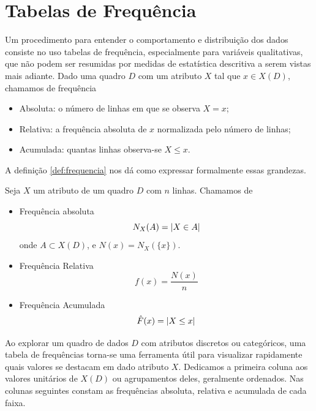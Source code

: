 \section{Tabelas de Frequência}

Um procedimento para entender o comportamento e distribuição dos dados consiste no uso
tabelas de frequência, especialmente para variáveis qualitativas, que não podem ser
resumidas por medidas de estatística descritiva a serem vistas mais adiante.
Dado uma quadro $D$ com um atributo $X$ tal que $x \in X(D)$, chamamos de frequência
\begin{itemize}
\item Absoluta: o número de linhas em que se observa $X = x$;
\item Relativa: a frequência absoluta de $x$ normalizada pelo número de linhas;
\item Acumulada: quantas linhas observa-se $X \le x$.
\end{itemize}
A definição \ref{def:frequencia} nos dá como expressar formalmente essas grandezas.

\begin{def:frequencia}
\label{def:frequencia}
Seja $X$ um atributo de um quadro $D$ com $n$ linhas.
Chamamos de
\begin{itemize}
\item Frequência absoluta
\[
    N_X(A) = \lvert X \in A \rvert
\]
onde $A \subset X(D)$, e $N(x) = N_X(\{x\})$.

\item Frequência Relativa
\[
    f(x) = \frac{N(x)}{n}
\]

\item Frequência Acumulada
\[
    \hat F(x) = \lvert X \le x \rvert
\]
\end{itemize}
\end{def:frequencia}

Ao explorar um quadro de dados $D$ com atributos discretos ou categóricos, uma tabela de
frequências torna-se uma ferramenta útil para visualizar rapidamente quais valores se
destacam em dado atributo $X$.
Dedicamos a primeira coluna aos valores unitários de $X(D)$ ou agrupamentos deles,
geralmente ordenados.
Nas colunas seguintes constam as frequências absoluta, relativa e acumulada de cada faixa.

